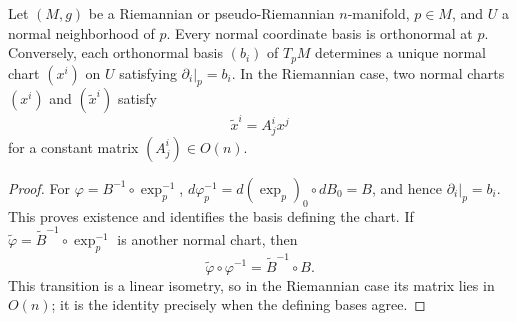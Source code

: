 \begin{proposition}
\label{prop:uniqueness-normal-coordinates}

Let $(M,g)$ be a Riemannian or pseudo-Riemannian $n$-manifold, $p\in M$, and
$U$ a normal neighborhood of $p$.  Every normal coordinate basis is
orthonormal at $p$.  Conversely, each orthonormal basis $(b_i)$ of $T_pM$
determines a unique normal chart $(x^i)$ on $U$ satisfying
$\partial_i|_p=b_i$.  In the Riemannian case, two normal charts $(x^i)$ and
$(\tilde x^i)$ satisfy
\begin{equation}
\tilde{x}^i = A^i_j x^j \tag{5.19}
\end{equation}
for a constant matrix $(A^i_j)\in O(n)$.

\begin{proof}
\sketch
For $\varphi=B^{-1}\circ\exp_p^{-1}$,
$d\varphi_p^{-1}=d(\exp_p)_0\circ dB_0=B$, and hence
$\partial_i|_p=b_i$.  This proves existence and identifies the basis defining
the chart.  If $\widetilde\varphi=\widetilde B^{-1}\circ\exp_p^{-1}$ is
another normal chart, then
\[
\widetilde\varphi\circ\varphi^{-1}=\widetilde B^{-1}\circ B.
\]
This transition is a linear isometry, so in the Riemannian case its matrix
lies in $O(n)$; it is the identity precisely when the defining bases agree.
\end{proof}
\end{proposition}

